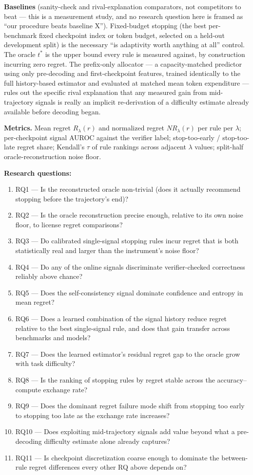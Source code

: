 \documentclass[11pt]{article}
\begin{document}
\textbf{Baselines} (sanity-check and rival-explanation comparators, not competitors to beat --- this is a measurement study, and no research question here is framed as ``our procedure beats baseline X''). Fixed-budget stopping (the best per-benchmark fixed checkpoint index or token budget, selected on a held-out development split) is the necessary ``is adaptivity worth anything at all'' control. The oracle $t^*$ is the upper bound every rule is measured against, by construction incurring zero regret. The prefix-only allocator --- a capacity-matched predictor using only pre-decoding and first-checkpoint features, trained identically to the full history-based estimator and evaluated at matched mean token expenditure --- rules out the specific rival explanation that any measured gain from mid-trajectory signals is really an implicit re-derivation of a difficulty estimate already available before decoding began.

\textbf{Metrics.} Mean regret $R_\lambda(r)$ and normalized regret $NR_\lambda(r)$ per rule per $\lambda$; per-checkpoint signal AUROC against the verifier label; stop-too-early / stop-too-late regret share; Kendall's $\tau$ of rule rankings across adjacent $\lambda$ values; split-half oracle-reconstruction noise floor.

\textbf{Research questions:}
\begin{enumerate}[leftmargin=1.6em]
\item RQ1 --- Is the reconstructed oracle non-trivial (does it actually recommend stopping before the trajectory's end)?
\item RQ2 --- Is the oracle reconstruction precise enough, relative to its own noise floor, to license regret comparisons?
\item RQ3 --- Do calibrated single-signal stopping rules incur regret that is both statistically real and larger than the instrument's noise floor?
\item RQ4 --- Do any of the online signals discriminate verifier-checked correctness reliably above chance?
\item RQ5 --- Does the self-consistency signal dominate confidence and entropy in mean regret?
\item RQ6 --- Does a learned combination of the signal history reduce regret relative to the best single-signal rule, and does that gain transfer across benchmarks and models?
\item RQ7 --- Does the learned estimator's residual regret gap to the oracle grow with task difficulty?
\item RQ8 --- Is the ranking of stopping rules by regret stable across the accuracy--compute exchange rate?
\item RQ9 --- Does the dominant regret failure mode shift from stopping too early to stopping too late as the exchange rate increases?
\item RQ10 --- Does exploiting mid-trajectory signals add value beyond what a pre-decoding difficulty estimate alone already captures?
\item RQ11 --- Is checkpoint discretization coarse enough to dominate the between-rule regret differences every other RQ above depends on?
\end{enumerate}
\end{document}

